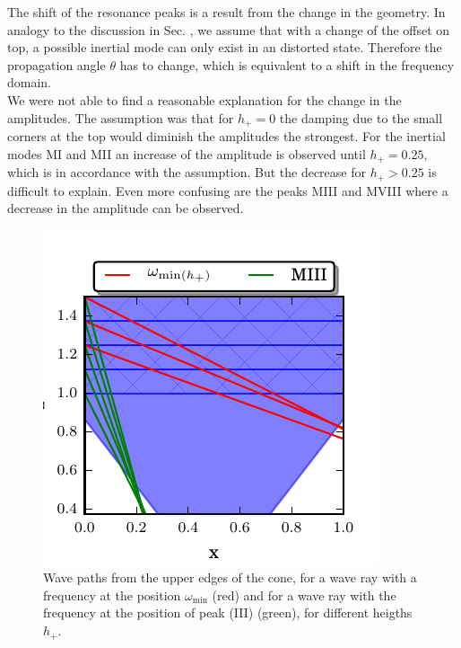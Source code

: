The shift of the resonance peaks is a result from the change in the geometry.
In analogy to the discussion in Sec. \label{cone:discussion_transition},
 we assume that with a change of the offset on top,
a possible inertial mode can only exist in an distorted state.
Therefore the propagation angle $\theta$ has to change,
which is equivalent to a shift in the frequency domain.\\
We were not able to find a reasonable explanation for the change in the amplitudes.
The assumption was that for $h_+=0$ the damping due to the small corners at the top
would diminish the amplitudes the strongest.
For the inertial modes M\RN{1} and M\RN{2} an increase of the amplitude is observed until $h_+=0.25$,
which is in accordance with the assumption.
But the decrease for $h_+>0.25$ is difficult to explain.
Even more confusing are  the peaks M\RN{3} and M\RN{8} where a decrease in the amplitude
can be observed.

\begin{figure}[!t]
  \begin{minipage}[c]{0.4\textwidth}
      \centering
      \includegraphics{gfx/cone/discussion/corners.pdf}
  \end{minipage}
  \hfill
  \begin{minipage}[c]{0.5\textwidth}
      \caption{\label{fig:conediscuss:corners}
        Wave paths from the upper edges of the cone,
        for a wave ray with a frequency at the position $\omega_{\text{min}}$ (red) and
        for a wave ray with the frequency at the position of peak (\RN{3}) (green),
            for different heigths $h_+$.
      }
  \end{minipage}
\end{figure}


